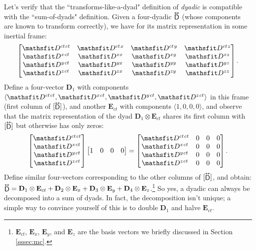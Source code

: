 \documentclass[12pt]{article}
\renewcommand{\vv}[1]{\mathbf{#1}}
\newcommand{\tightoverset}[2]{%
  \mathop{#2}\limits^{\vbox to -.5ex{\kern-0.75ex\hbox{$#1$}\vss}}}
\newcommand{\inlinedy}[1]{\tightoverset{\text{\tiny$\bm\leftrightarrow$}}{#1}}
\begin{document}
Let's verify that the ``transforms-like-a-dyad" definition of \emph{dyadic} is compatible with the ``sum-of-dyads" definition. Given a four-dyadic $\inlinedy{\mathsf{D}}$ (whose components are known to transform correctly), we have for its matrix representation in some inertial frame:
\begin{equation*}
\begin{bmatrix}
\mathsfit D^{ct \mkern1.5mu ct} & \mathsfit D^{ct \mkern1.5mu x} & \mathsfit D^{ct \mkern1.5mu y} & \mathsfit D^{ct \mkern1.5mu z} \\
\mathsfit D^{x \mkern1.5mu ct} & \mathsfit D^{x x} & \mathsfit D^{x y} & \mathsfit D^{x z}  \\
\mathsfit D^{y \mkern1.5mu ct} & \mathsfit D^{y x} & \mathsfit D^{y y} & \mathsfit D^{y z}  \\
\mathsfit D^{z \mkern1.5mu ct} & \mathsfit D^{z x} & \mathsfit D^{z y} & \mathsfit D^{z z} 
\end{bmatrix}.
\end{equation*}
Define a four-vector $\vv D_1$ with components $\langle \mathsfit D^{ct \mkern1.5mu ct}, \mathsfit D^{x \mkern1.5mu ct}, \mathsfit D^{y \mkern1.5mu ct}, \mathsfit D^{z \mkern1.5mu ct} \rangle$ in this frame (first column of $[ \inlinedy{\mathsf{D}} ]$), and another $\vv E_{ct}$ with components $\langle 1, 0, 0, 0 \rangle$, and observe that the matrix representation of the dyad $\vv D_1 \otimes \vv E_{ct}$ shares its first column with $[ \inlinedy{\mathsf{D}} ]$ but otherwise has only zeros:
\begin{equation*}
\begin{bmatrix}
\mathsfit D^{ct \mkern1.5mu ct} \\
\mathsfit D^{x \mkern1.5mu ct} \\
 \mathsfit D^{y \mkern1.5mu ct} \\
\mathsfit D^{z \mkern1.5mu ct}
\end{bmatrix}
\begin{bmatrix}
1 & 0 & 0 & 0
\end{bmatrix}
=
\begin{bmatrix}
\mathsfit D^{ct \mkern1.5mu ct} & 0 & 0 & 0 \\
\mathsfit D^{x \mkern1.5mu ct} & 0 & 0 & 0 \\
\mathsfit D^{y \mkern1.5mu ct} & 0 & 0 & 0 \\
\mathsfit D^{z \mkern1.5mu ct} & 0 & 0 & 0
\end{bmatrix}.
\end{equation*}
Define similar four-vectors corresponding to the other columns of $[ \inlinedy{\mathsf{D}} ]$, and obtain: $\inlinedy{\mathsf{D}} = \vv D_1 \otimes \vv E_{ct} + \vv D_2 \otimes \vv E_{x} + \vv D_3 \otimes \vv E_{y} + \vv D_4 \otimes \vv E_{z}$.\footnote{$\vv E_{ct}$, $\vv E_{x}$, $\vv E_{y}$, and $\vv E_{z}$ are the basis vectors we briefly discussed in Section \ref{sssec:mc}.} So yes, a dyadic can always be decomposed into a sum of dyads. In fact, the decomposition isn't unique; a simple way to convince yourself of this is to double $\vv D_1$ and halve $\vv E_{ct}$.
\end{document}
